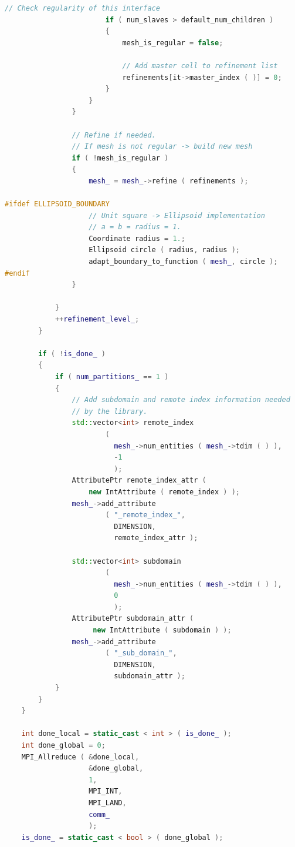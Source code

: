 \documentclass[a4paper, 11pt, twoside]{article}
\begin{document}
\begin{lstlisting}[language=C++, basicstyle={\footnotesize, \ttfamily}, keywordstyle=\color{blue}, numbers=none, tabsize=4]
                        // Check regularity of this interface
                        if ( num_slaves > default_num_children )
                        {
                            mesh_is_regular = false;

                            // Add master cell to refinement list
                            refinements[it->master_index ( )] = 0;
                        }
                    }
                }

                // Refine if needed.
                // If mesh is not regular -> build new mesh
                if ( !mesh_is_regular )
                {
                    mesh_ = mesh_->refine ( refinements );

#ifdef ELLIPSOID_BOUNDARY
                    // Unit square -> Ellipsoid implementation
                    // a = b = radius = 1.
                    Coordinate radius = 1.;
                    Ellipsoid circle ( radius, radius );
                    adapt_boundary_to_function ( mesh_, circle );
#endif
                }

            }
            ++refinement_level_;
        }

        if ( !is_done_ )
        {
            if ( num_partitions_ == 1 )
            {
                // Add subdomain and remote index information needed 
                // by the library.
                std::vector<int> remote_index
                        (
                          mesh_->num_entities ( mesh_->tdim ( ) ),
                          -1
                          );
                AttributePtr remote_index_attr ( 
                    new IntAttribute ( remote_index ) );
                mesh_->add_attribute
                        ( "_remote_index_",
                          DIMENSION,
                          remote_index_attr );

                std::vector<int> subdomain
                        (
                          mesh_->num_entities ( mesh_->tdim ( ) ),
                          0
                          );
                AttributePtr subdomain_attr ( 
                     new IntAttribute ( subdomain ) );
                mesh_->add_attribute
                        ( "_sub_domain_",
                          DIMENSION,
                          subdomain_attr );
            }
        }
    }

    int done_local = static_cast < int > ( is_done_ );
    int done_global = 0;
    MPI_Allreduce ( &done_local,
                    &done_global,
                    1,
                    MPI_INT,
                    MPI_LAND,
                    comm_
                    );
    is_done_ = static_cast < bool > ( done_global );


\end{lstlisting}
\end{document}
